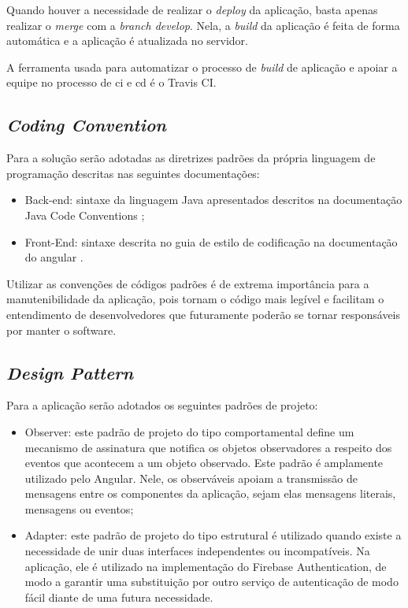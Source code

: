 Quando houver a necessidade de realizar o \textit{\gls{deploy}} da aplicação, basta apenas realizar o \textit{merge} com a \textit{branch develop}. Nela, a \textit{\gls{build}} da aplicação é feita de forma automática e a aplicação é atualizada no servidor. 


A ferramenta usada para automatizar o processo de \textit{\gls{build}} de aplicação e apoiar a equipe no processo de \ac{ci} e \ac{cd} é o Travis CI.


\subsection{\textit{Coding Convention}}
Para a solução serão adotadas as diretrizes padrões da própria linguagem de programação descritas nas seguintes documentações:

\begin{itemize}
\item Back-end: sintaxe da linguagem Java  apresentados descritos na documentação Java Code Conventions \cite{javacodeconvention:1997};
\item Front-End: sintaxe descrita no guia de estilo de codificação na documentação do angular \cite{angularstyleguide:2021}.
\end{itemize}


Utilizar as convenções de códigos padrões é de extrema importância para a manutenibilidade da aplicação, pois tornam o código mais legível e facilitam o entendimento de desenvolvedores que futuramente poderão se tornar responsáveis por manter o software.



\subsection{\textit{Design Pattern}}
Para a aplicação serão adotados os seguintes padrões de projeto:
\begin{itemize}
\item  Observer: este padrão de projeto do tipo comportamental define um mecanismo de assinatura que notifica os objetos observadores a respeito dos eventos que acontecem a um objeto observado. 
Este padrão é amplamente utilizado pelo Angular. Nele, os observáveis apoiam a transmissão de mensagens entre os componentes da aplicação, sejam elas mensagens literais, mensagens ou eventos;
\item Adapter: este padrão de projeto do tipo estrutural é utilizado quando existe a necessidade de unir duas interfaces independentes ou incompatíveis. Na aplicação, ele é utilizado na implementação do Firebase Authentication, de modo a garantir uma substituição por outro serviço de autenticação de modo fácil diante de uma futura necessidade.
\end{itemize}

